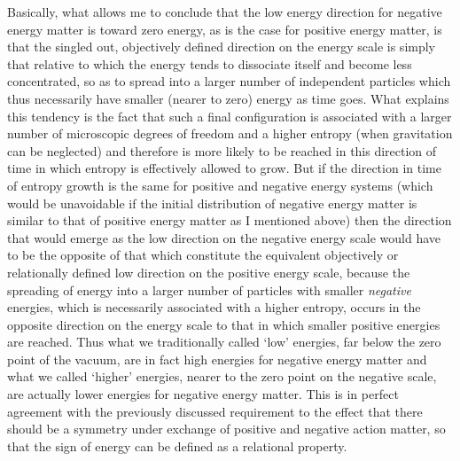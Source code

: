 \documentclass[notitlepage,12pt]{report}
\begin{document}
Basically, what allows me to conclude that the low energy direction for negative energy matter is toward zero energy, as is the case for positive energy matter, is that the singled out, objectively defined direction on the energy scale is simply that relative to which the energy tends to dissociate itself and become less concentrated, so as to spread into a larger number of independent particles which thus necessarily have smaller (nearer to zero) energy as time goes. What explains this tendency is the fact that such a final configuration is associated with a larger number of microscopic degrees of freedom and a higher entropy (when gravitation can be neglected) and therefore is more likely to be reached in this direction of time in which entropy is effectively allowed to grow. But if the direction in time of entropy growth is the same for positive and negative energy systems (which would be unavoidable if the initial distribution of negative energy matter is similar to that of positive energy matter as I mentioned above) then the direction that would emerge as the low direction on the negative energy scale would have to be the opposite of that which constitute the equivalent objectively or relationally defined low direction on the positive energy scale, because the spreading of energy into a larger number of particles with smaller \textit{negative} energies, which is necessarily associated with a higher entropy, occurs in the opposite direction on the energy scale to that in which smaller positive energies are reached. Thus what we traditionally called `low' energies, far below the zero point of the vacuum, are in fact high energies for negative energy matter and what we called `higher' energies, nearer to the zero point on the negative scale, are actually lower energies for negative energy matter. This is in perfect agreement with the previously discussed requirement to the effect that there should be a symmetry under exchange of positive and negative action matter, so that the sign of energy can be defined as a relational property.
\end{document}
